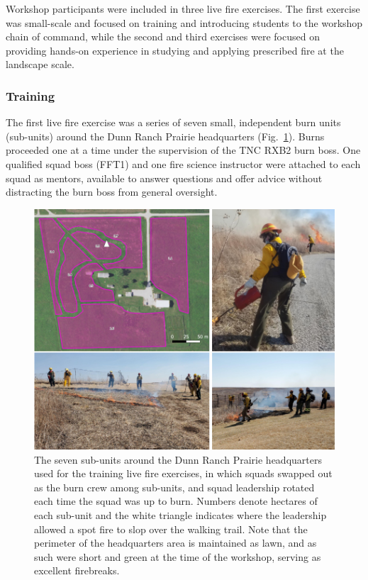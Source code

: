 \documentclass[fire,article,submit,moreauthors,pdftex]{Definitions/mdpi}
\begin{document}
Workshop participants were included in three live fire exercises.
The first exercise was small-scale and focused on training and introducing students to the workshop chain of command, while the second and third exercises were focused on providing hands-on experience in studying and applying prescribed fire at the landscape scale.

\hypertarget{training}{%
\subsubsection{Training}\label{training}}

The first live fire exercise was a series of seven small, independent burn units (sub-units) around the Dunn Ranch Prairie headquarters (Fig.~\ref{HQmap}).
Burns proceeded one at a time under the supervision of the TNC RXB2 burn boss.
One qualified squad boss (FFT1) and one fire science instructor were attached to each squad as mentors, available to answer questions and offer advice without distracting the burn boss from general oversight.

\begin{figure}
\centering
\includegraphics[width=1\columnwidth]{HQburns.png}
\caption{\label{HQmap}The seven sub-units around the Dunn Ranch Prairie headquarters used for the training live fire exercises, in which squads swapped out as the burn crew among sub-units, and squad leadership rotated each time the squad was up to burn. Numbers denote hectares of each sub-unit and the white triangle indicates where the leadership allowed a spot fire to slop over the walking trail. Note that the perimeter of the headquarters area is maintained as lawn, and as such were short and green at the time of the workshop, serving as excellent firebreaks.}
\end{figure}
\end{document}
